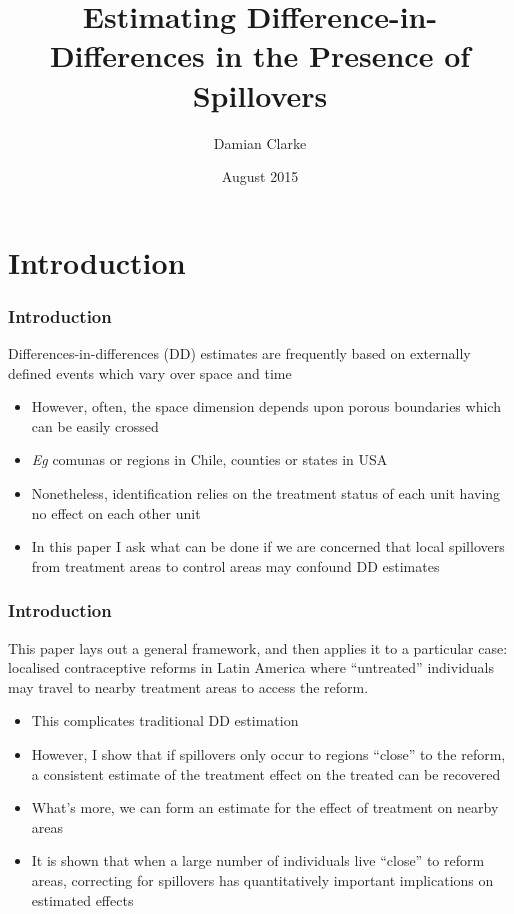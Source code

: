 \documentclass[10pt,letterpaper,subeqn]{beamer}
\title{Estimating Difference-in-Differences in the Presence of Spillovers}
\author{Damian Clarke\inst{\dag} }
\institute{\inst{\dag}  University of Oxford}
\date{August 2015}
\begin{document}
\begin{frame}
\titlepage
\end{frame}

\section{Introduction}
\begin{frame}[label=int1]
  \frametitle{Introduction}
Differences-in-differences (DD) estimates are frequently based on externally
defined events which vary over space and time
\vspace{7mm}
\begin{itemize}
\item However, often, the space dimension depends upon porous boundaries 
which can be easily crossed
\item \emph{Eg} comunas or regions in Chile, counties or states in USA
\item Nonetheless, identification relies on the treatment status of each unit
having no effect on each other unit
\item In this paper I ask what can be done if we are concerned that local 
spillovers from treatment areas to control areas may confound DD estimates
\end{itemize}
\end{frame}


\begin{frame}[label=int2]
  \frametitle{Introduction}
This paper lays out a general framework, and then applies it to a particular 
case: localised contraceptive reforms in Latin America where ``untreated'' 
individuals may travel to nearby treatment areas to access the reform.
\vspace{5mm}
\begin{itemize}
\item This complicates traditional DD estimation
\item However, I show that if spillovers only occur to regions ``close'' to the
reform, a consistent estimate of the treatment effect on the treated can be
recovered
\item What's more, we can form an estimate for the effect of treatment on
nearby areas
\item It is shown that when a large number of individuals live ``close'' to 
reform areas, correcting for spillovers has quantitatively important implications 
on estimated effects
\end{itemize}
\end{frame}
\end{document}

